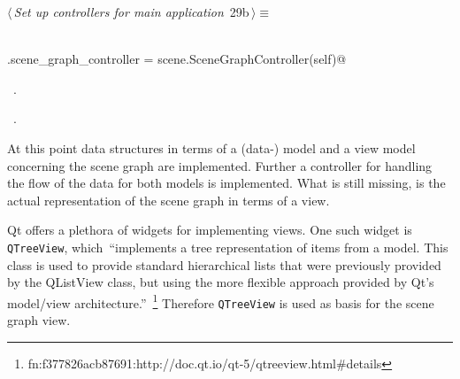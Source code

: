 \documentclass[
    a4paper,      %
    10pt,         %
    openright,    %
    notitlepage,  %
    parskip=half, %
]{scrreprt}       %
\theoremstyle{definition}                    %
\begin{document}
\begin{flushleft} \small
\begin{minipage}{\linewidth}\label{scrap30}\raggedright\small
{} $\langle\,${\itshape Set up controllers for main application}\nobreak\ {\footnotesize {29b}}$\,\rangle\equiv$
\vspace{-1ex}
\begin{list}{}{} \item
\mbox{}\lstinline@@\\
\mbox{}\lstinline@self.scene_graph_controller = scene.SceneGraphController(self)@{\NWsep}
\end{list}
\vspace{-1.5ex}
\footnotesize
\begin{list}{}{\setlength{\itemsep}{-\parsep}\setlength{\itemindent}{-\leftmargin}}
\item \NWtxtMacroDefBy\ .
\item \NWtxtMacroRefIn\ .

\item{}
\end{list}
\end{minipage}\vspace{4ex}
\end{flushleft}
At this point data structures in terms of a (data-) model and a view model
concerning the scene graph are implemented. Further a controller for handling
the flow of the data for both models is implemented. What is still missing, is
the actual representation of the scene graph in terms of a view.

Qt offers a plethora of widgets for implementing views. One such widget is
\verb+QTreeView+, which~\enquote{implements a tree representation of items from
a model. This class is used to provide standard hierarchical lists that were
previously provided by the QListView class, but using the more flexible approach
provided by Qt's model/view
architecture.}~\footnote{fn:f377826acb87691:http://doc.qt.io/qt-5/qtreeview.html\#details}
Therefore \verb+QTreeView+ is used as basis for the scene graph view.
\end{document}
